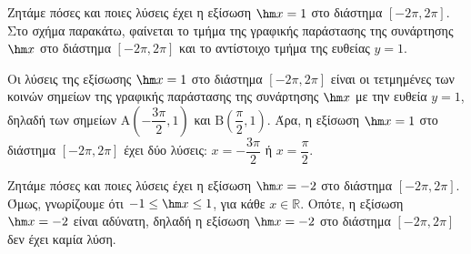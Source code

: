 \begin{alist}
\item Ζητάμε πόσες και ποιες λύσεις έχει η εξίσωση $\hm  x = 1$ στο διάστημα $[-2\pi, 2\pi]$. \\
Στο σχήμα παρακάτω, φαίνεται το τμήμα της γραφικής παράστασης της συνάρτησης $\hm  x$ στο διάστημα $[-2\pi, 2\pi]$ και το αντίστοιχο τμήμα της ευθείας $y = 1$.
\begin{center}
\end{center}
Οι λύσεις της εξίσωσης $\hm  x = 1$ στο διάστημα $[-2\pi, 2\pi]$ είναι οι τετμημένες των κοινών σημείων της γραφικής παράστασης της συνάρτησης $\hm  x$ με την ευθεία $y = 1$, δηλαδή των σημείων $\text{A}\left(-\dfrac{3\pi}{2}, 1\right)$ και $\text{B}\left(\dfrac{\pi}{2}, 1\right)$. Άρα, η εξίσωση $\hm  x = 1$ στο διάστημα $[-2\pi, 2\pi]$ έχει δύο λύσεις: $x = -\dfrac{3\pi}{2}$ ή $x = \dfrac{\pi}{2}$.
\item Ζητάμε πόσες και ποιες λύσεις έχει η εξίσωση $\hm  x = -2$ στο διάστημα $[-2\pi, 2\pi]$. \\
Όμως, γνωρίζουμε ότι $-1 \le \hm  x \le 1$, για κάθε $x \in \mathbb{R}$. Οπότε, η εξίσωση $\hm  x = -2$ είναι αδύνατη, δηλαδή η εξίσωση $\hm  x = -2$ στο διάστημα $[-2\pi, 2\pi]$ δεν έχει καμία λύση.
\end{alist}

